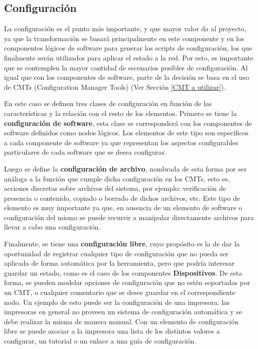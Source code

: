 \subsection{Configuración}
La configuración es el punto más importante, y que mayor valor da al proyecto, ya que la transformación se basará principalmente en este componente y en los componentes lógicos de software para generar los scripts de configuración, los que finalmente serán utilizados para aplicar el estado a la red.
Por esto, es importante que se contemplen la mayor cantidad de escenarios posibles de configuración.
Al igual que con los componentes de software, parte de la decisión se basa en el uso de CMTs (Configuration Manager Tools) (Ver Sección \ref{CMT a utilizar}).

En este caso se definen tres clases de configuración en función de las características y la relación con el resto de los elementos.
Primero se tiene la \textbf{configuración de software}, esta clase se corresponderá con los componentes de software definidos como nodos lógicos. Los elementos de este tipo son específicos a cada componente de software ya que representan los aspectos configurables particulares de cada software que se desea configurar.

Luego se define la \textbf{configuración de archivo}, nombrada de esta forma por ser análoga a la función que cumple dicha configuración en los CMTs, esto es, acciones discretas sobre archivos del sistema, por ejemplo: verificación de presencia o contenido, copiado o borrado de dichos archivos, etc. Este tipo de elemento es muy importante ya que, en ausencia de un elemento de software o configuración del mismo se puede recurrir a manipular directamente archivos para llevar a cabo una configuración.

Finalmente, se tiene una \textbf{configuración libre}, cuyo propósito es la de dar la oportunidad de registrar cualquier tipo de configuración que no pueda ser aplicada de forma automática por la herramienta, pero que podría interesar guardar un estado, como es el caso de los componentes \textbf{Dispositivos}. De esta forma, se pueden modelar opciones de configuración que no estén soportadas por un CMT, o cualquier comentario que se desee guardar en el correspondiente nodo. 
Un ejemplo de esto puede ser la configuración de una impresora: las impresoras en general no proveen un sistema de configuración automática y se debe realizar la misma de manera manual. Con un elemento de configuración libre se puede asociar a la impresora una lista de los distintos valores a configurar, un tutorial o un enlace a una guía de configuración.


